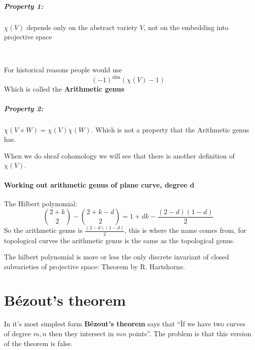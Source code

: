 \subparagraph*{Property 1:}
$\chi(V)$ depends only on the abstract variety $V$, not on the embedding into projective space

\

\begin{definition}
    For historical reasons people would use \[{(-1)}^\text{dim}(\chi(V)-1)\]    
Which is called the \textbf{Arithmetic genus}
\end{definition}

\subparagraph*{Property 2:}
$\chi(V\times W) = \chi(V)\chi(W)$.
Which is not a property that the Arithmetic genus has.

\begin{remark}
    When we do sheaf cohomology we will see that there is another definition of $\chi(V)$.    
\end{remark}

\paragraph*{Working out arithmetic genus of plane curve, degree d}
\begin{example}
    The Hilbert polynomial:\[
        \binom{2+k}{2} - \binom{2+k-d}{2} = 1 + dk - \frac{(2-d)(1-d)}{2}
    \]    
    So the arithmetic genus is $\frac{(2-d)(1-d)}{2}$, this is where the name comes from, for topological curves the arithmetic genus is the same as the topological genus.
\end{example}

The hilbert polynomial is more or less the only discrete invariant of closed subvarieties of projective space: Theorem by R. Hartshorne.

\section{Bézout's theorem}
In it's most simplest form \textbf{Bézout's theorem} says that ``Ìf we have two curves of degree $m,n$ then they intersect in $mn$ points''. The problem is that this version of the theorem is false.

